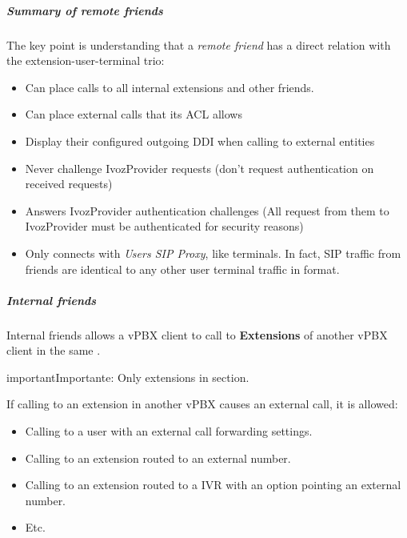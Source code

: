 \documentclass[letterpaper,10pt,spanish]{sphinxmanual}
\begin{document}
\subparagraph{Summary of remote friends}
\label{administration_portal/client/vpbx/routing_endpoints/friends/remote_friends:summary-of-remote-friends}
The key point is understanding that a \emph{remote friend} has a direct relation with the
extension-user-terminal trio:
\begin{itemize}
\item {} 
Can place calls to all internal extensions and other friends.

\item {} 
Can place external calls that its ACL allows

\item {} 
Display their configured outgoing DDI when calling to external entities

\item {} 
Never challenge IvozProvider requests (don't request authentication on received requests)

\item {} 
Answers IvozProvider authentication challenges (All request from them to
IvozProvider must be authenticated for security reasons)

\item {} 
Only connects with \emph{Users SIP Proxy}, like terminals. In fact, SIP traffic from
friends are identical to any other user terminal traffic in format.

\end{itemize}


\subparagraph{Internal friends}
\label{administration_portal/client/vpbx/routing_endpoints/friends/internal_friends:id1}\label{administration_portal/client/vpbx/routing_endpoints/friends/internal_friends::doc}\label{administration_portal/client/vpbx/routing_endpoints/friends/internal_friends:internal-friends}
Internal friends allows a vPBX client to call to \textbf{Extensions} of another vPBX client in the same {\hyperref[administration_portal/brand/settings/corporations:corporations]{}}.

\begin{notice}{important}{Importante:}
Only extensions in {\hyperref[administration_portal/client/vpbx/extensions:extensions]{}} section.
\end{notice}

If calling to an extension in another vPBX causes an external call, it is allowed:
\begin{itemize}
\item {} 
Calling to a user with an external call forwarding settings.

\item {} 
Calling to an extension routed to an external number.

\item {} 
Calling to an extension routed to a IVR with an option pointing an external number.

\item {} 
Etc.

\end{itemize}
\end{document}
